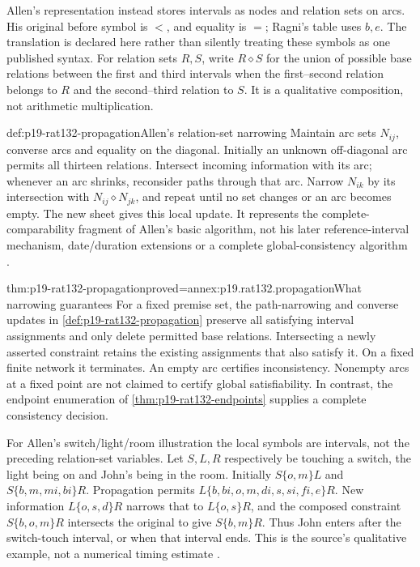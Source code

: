 Allen's representation instead stores intervals as nodes and relation sets
on arcs. His original before symbol is \(<\), and equality is \(=\);
Ragni's table uses \(b,e\). The translation is declared here rather than
silently treating these symbols as one published syntax. For relation sets
\(R,S\), write \(R\diamond S\) for the union of possible base
relations between the first and third intervals when the first--second
relation belongs to \(R\) and the second--third relation to \(S\).
It is a qualitative composition, not arithmetic multiplication.

\begin{hbmethod}{def:p19-rat132-propagation}{Allen's relation-set narrowing}
Maintain arc sets \(N_{ij}\), converse arcs and equality on the diagonal.
Initially an unknown off-diagonal arc permits all thirteen relations.
Intersect incoming information with its arc; whenever an arc shrinks,
reconsider paths through that arc. Narrow \(N_{ik}\) by its intersection
with \(N_{ij}\diamond N_{jk}\), and repeat until no set changes or
an arc becomes empty. The new sheet gives this local update. It represents
the complete-comparability fragment of Allen's basic algorithm, not his
later reference-interval mechanism, date/duration extensions or a complete
global-consistency algorithm \cite[secs.~4.1--4.3]{Allen1983TemporalIntervals}.
\end{hbmethod}



\begin{hbtheorem}{thm:p19-rat132-propagation}{proved=annex:p19.rat132.propagation}{What narrowing guarantees}
For a fixed premise set, the path-narrowing and converse updates in
\cref{def:p19-rat132-propagation} preserve all satisfying interval
assignments and only delete permitted base relations. Intersecting a newly
asserted constraint retains the existing assignments that also satisfy it.
On a fixed
finite network it terminates. An empty arc certifies inconsistency.
Nonempty arcs at a fixed point are not claimed to certify global
satisfiability. In contrast, the endpoint enumeration of
\cref{thm:p19-rat132-endpoints} supplies a complete consistency decision.
\end{hbtheorem}

For Allen's switch/light/room illustration the local symbols are intervals,
not the preceding relation-set variables. Let \(S,L,R\) respectively
be touching a switch, the light being on and John's being in the room.
Initially \(S\{o,m\}L\) and \(S\{b,m,mi,bi\}R\).
Propagation permits
\(L\{b,bi,o,m,di,s,si,fi,e\}R\).
New information \(L\{o,s,d\}R\) narrows that to
\(L\{o,s\}R\), and the composed constraint
\(S\{b,o,m\}R\) intersects the original to give
\(S\{b,m\}R\). Thus John enters after the switch-touch interval,
or when that interval ends. This is the source's qualitative example, not
a numerical timing estimate \cite[sec.~4.2, p.~837]{Allen1983TemporalIntervals}.

